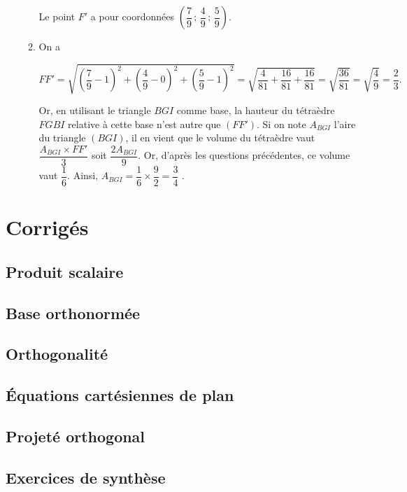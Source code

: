 \documentclass[11pt,fleqn, openany]{book} %
\begin{document}
\begin{solution}
\begin{enumerate}
\begin{enumerate}
Le point $F'$ a pour coordonnées $\left(\dfrac{7}{9} \, ;\, \dfrac{4}{9} \,;\, \dfrac{5}{9}\right)$.
\vskip5pt
\item On a

\[FF' = \sqrt{\left(\dfrac{7}{9}-1\right)^2+\left(\dfrac{4}{9}-0\right)^2 + \left(\dfrac{5}{9}-1\right)^2}=\sqrt{ \dfrac{4}{81}+\dfrac{16}{81}+\dfrac{16}{81}}=\sqrt{\dfrac{36}{81}}=\sqrt{\dfrac{4}{9}}=\dfrac{2}{3}.\]

Or, en utilisant le triangle $BGI$ comme base, la hauteur du tétraèdre $FGBI$ relative à cette base n'est autre que $(FF')$. Si on note $A_{BGI}$ l'aire du triangle $(BGI)$, il en vient que le volume du tétraèdre vaut $\dfrac{A_{BGI} \times FF'}{3}$ soit $\dfrac{2A_{BGI}}{9}$. Or, d'après les questions précédentes, ce volume vaut $\dfrac{1}{6}$. Ainsi, $A_{BGI}= \dfrac{1}{6} \times \dfrac{9}{2} = \dfrac{3}{4}$ .
\end{enumerate} \end{enumerate}\end{solution}

\chapter{Corrigés}

\section*{Produit scalaire}

\printsolutions[collection={geom11}, headings={false} ]

\section*{Base orthonormée}


\printsolutions[collection={geom12}, headings={false} ]

\section*{Orthogonalité}

\printsolutions[collection={geom13}, headings={false} ]

\section*{Équations cartésiennes de plan}

\printsolutions[collection={geom14}, headings={false} ]

\section*{Projeté orthogonal}


\printsolutions[collection={geom15}, headings={false} ]
\section*{Exercices de synthèse}

\printsolutions[collection={geom16}, headings={false} ]
\end{document}
